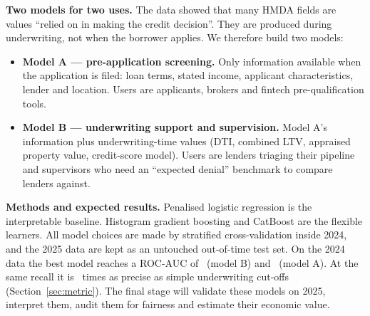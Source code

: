 \documentclass[11pt,a4paper]{article}
\begin{document}
\textbf{Two models for two uses.} The data showed that many HMDA fields are values
``relied on in making the credit decision''. They are produced during underwriting, not
when the borrower applies. We therefore build two models:
\begin{itemize}
  \item \textbf{Model A --- pre-application screening.} Only information available when the
  application is filed: loan terms, stated income, applicant characteristics, lender and
  location. Users are applicants, brokers and fintech pre-qualification tools.
  \item \textbf{Model B --- underwriting support and supervision.} Model A's information plus
  underwriting-time values (DTI, combined LTV, appraised property value, credit-score model).
  Users are lenders triaging their pipeline and supervisors who need an ``expected denial''
  benchmark to compare lenders against.
\end{itemize}

\textbf{Methods and expected results.} Penalised logistic regression is the interpretable
baseline. Histogram gradient boosting and CatBoost are the flexible learners. All model
choices are made by stratified cross-validation inside 2024, and the 2025 data are kept as
an untouched out-of-time test set. On the 2024 data the best model reaches a ROC-AUC of
\FinBauc\ (model B) and \FinAauc\ (model A). At the same recall it is \PrecRatio\ times as
precise as simple underwriting cut-offs (Section~\ref{sec:metric}). The final stage will
validate these models on 2025, interpret them, audit them for fairness and estimate their
economic value.

\end{document}
